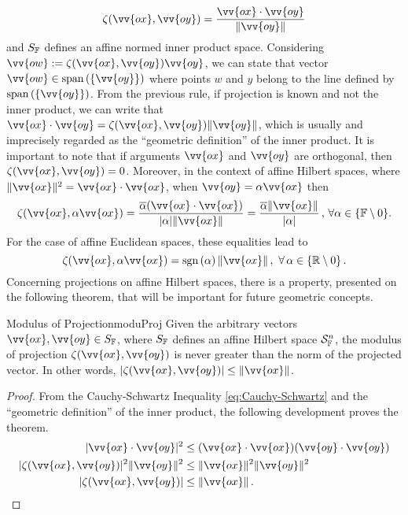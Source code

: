 \begin{equation}\label{eq:projection}
\fua{\zeta}{\vv{ox},\vv{oy}}=\dfrac{\vv{ox}\cdot \vv{oy}}{\|\vv{oy}\|}
\end{equation}
and $S_\cam{F}$ defines an affine normed inner product space. Considering $\vv{ow}:=\fua{\zeta}{\vv{ox},\vv{oy}}\vv{oy}$, we can state that vector $\vv{ow}\in\spn{(\{\vv{oy}\})}$ where points $w$ and $y$ belong to the line defined by $\spn{(\{\vv{oy}\})}$. From the previous rule, if projection is known and not the inner product, we can write that $\vv{ox}\cdot \vv{oy}=\fua{\zeta}{\vv{ox},\vv{oy}}\|\vv{oy}\|$, which is usually and imprecisely regarded as the ``geometric definition'' of the inner product. It is important to note that if arguments $\vv{ox}$ and $\vv{oy}$ are orthogonal, then $\fua{\zeta}{\vv{ox},\vv{oy}}=0$.
 Moreover, in the context of affine Hilbert spaces, where $\|\vv{ox}\|^2=\vv{ox}\cdot \vv{ox}$, when $\vv{oy}=\alpha\vv{ox}$ then
\begin{equation}\label{eq:projColinear}
\fua{\zeta}{\vv{ox},\alpha\vv{ox}}=\dfrac{\overline{\alpha}(\vv{ox}\cdot \vv{ox})}{|\alpha|\|\vv{ox}\|}=\dfrac{\overline{\alpha}\|\vv{ox}\|}{|\alpha|}\,,\,\forall\alpha\in\{\cam{F}\setminus 0\}.
\end{equation}
For the case of affine Euclidean spaces, these equalities lead to
\begin{equation}\label{eq:projColinearEuclid}
\fua{\zeta}{\vv{ox},\alpha\vv{ox}}=\sgn{\alpha}\|\vv{ox}\|\,,\,\,\forall\,\alpha\in\{\real\setminus 0\}\,.
\end{equation}
Concerning projections on affine Hilbert spaces, there is a property, presented on the following theorem, that will be important for future geometric concepts.

\begin{mteo}{Modulus of Projection}{moduProj}
Given the arbitrary vectors $\vv{ox},\vv{oy}\in S_\cam{F}$, where $S_\cam{F}$ defines an affine Hilbert space $\eamd{S}{F}{n}$, the modulus of projection $\fua{\zeta}{\vv{ox},\vv{oy}}$ is never greater than the norm of the projected vector. In other words,
$|\fua{\zeta}{\vv{ox},\vv{oy}}|\leq \|\vv{ox}\|$.
\end{mteo}
\hspace{1pt}
{\footnotesize
\begin{proof}
From the Cauchy-Schwartz Inequality \eqref{eq:Cauchy-Schwartz} and the ``geometric definition'' of the inner product, the following development proves the theorem.
\begin{align*}
|\vv{ox}\cdot\vv{oy}|^2 &\leq (\vv{ox}\cdot\vv{ox})(\vv{oy}\cdot\vv{oy})\\
|\fua{\zeta}{\vv{ox},\vv{oy}}|^2\|\vv{oy}\|^2 &\leq \|\vv{ox}\|^2\|\vv{oy}\|^2\\
|\fua{\zeta}{\vv{ox},\vv{oy}}| &\leq \|\vv{ox}\|\,.
\end{align*}
\end{proof}}

